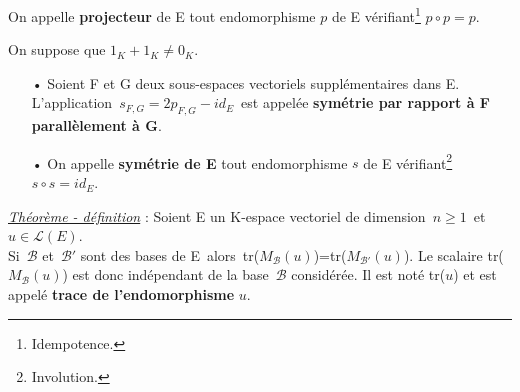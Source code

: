 \vspace{0.5cm}

On appelle \textbf{projecteur} de E tout endomorphisme \(p\) de E vérifiant\footnote{Idempotence.} \(p\circ p=p\).

\vspace{1.3cm}

\noindent On suppose que \(1_K + 1_K \neq 0_K \).\vspace{-0.1cm}
\begin{itemize}[leftmargin=0.8cm]
    \item[•] Soient F et G deux sous-espaces vectoriels supplémentaires dans E.\\
    L'application \(\,\displaystyle s_{F,G}=2p_{F,G}-id_E\,\) est appelée \textbf{symétrie par rapport à F parallèlement à G}.\vspace{0.2cm}

    \item[•]On appelle \textbf{symétrie de E} tout endomorphisme \(s\) de E vérifiant\footnote{Involution.} \(s\circ s= id_E\).
\end{itemize}

\vspace{1.3cm}

\underline{\emph{Théorème - définition}} : Soient E un K-espace vectoriel de dimension \(\,n\geq 1\,\) et \(u\in \mathscr{L}(E)\).\vspace{0.1cm}\\
Si \(\,\mathcal{B}\) et \(\,\mathcal{B}'\) sont des bases de E\, alors\, tr(\(M_\mathcal{B}(u)\))=tr(\(M_{\mathcal{B}'}(u)\)). Le scalaire tr(\(M_\mathcal{B}(u)\)) est donc indépendant de la base \(\,\mathcal{B}\) considérée. Il est noté tr($u$) et est appelé \textbf{trace de l'endomorphisme} $u$.

\vspace{1cm}

